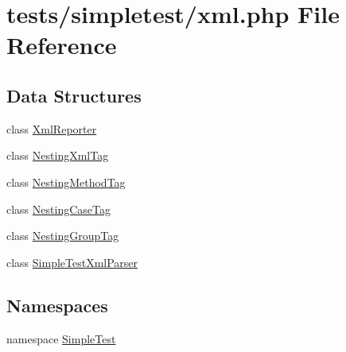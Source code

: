 \hypertarget{xml_8php}{\section{tests/simpletest/xml.php File Reference}
\label{xml_8php}
}
\subsection*{Data Structures}
\begin{DoxyCompactItemize}
\item 
class \hyperlink{class_xml_reporter}{Xml\-Reporter}
\item 
class \hyperlink{class_nesting_xml_tag}{Nesting\-Xml\-Tag}
\item 
class \hyperlink{class_nesting_method_tag}{Nesting\-Method\-Tag}
\item 
class \hyperlink{class_nesting_case_tag}{Nesting\-Case\-Tag}
\item 
class \hyperlink{class_nesting_group_tag}{Nesting\-Group\-Tag}
\item 
class \hyperlink{class_simple_test_xml_parser}{Simple\-Test\-Xml\-Parser}
\end{DoxyCompactItemize}
\subsection*{Namespaces}
\begin{DoxyCompactItemize}
\item 
namespace \hyperlink{namespace_simple_test}{Simple\-Test}
\end{DoxyCompactItemize}
